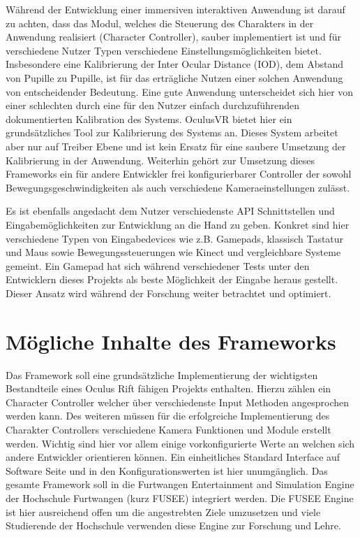 \documentclass[pagesize, paper=a4, fontsize=12pt,titlepage=true, headings=small, headnosepline, abstractoff, liststotoc, nochapterprefix, plainheadsepline]{scrreprt}
\begin{document}
Während der Entwicklung einer immersiven interaktiven Anwendung ist darauf zu achten, dass das Modul, welches die Steuerung des Charakters in der Anwendung realisiert (Character Controller), sauber implementiert ist und für verschiedene Nutzer Typen verschiedene Einstellungsmöglichkeiten bietet. Insbesondere eine Kalibrierung der Inter Ocular Distance (IOD), dem Abstand von Pupille zu Pupille, ist für das erträgliche Nutzen einer solchen Anwendung von entscheidender Bedeutung. Eine gute Anwendung unterscheidet sich hier von einer schlechten durch eine für den Nutzer einfach durchzuführenden dokumentierten Kalibration des Systems. OculusVR bietet hier ein grundsätzliches Tool zur Kalibrierung des Systems an. Dieses System arbeitet aber nur auf Treiber Ebene und ist kein Ersatz für eine saubere Umsetzung der Kalibrierung in der Anwendung.
Weiterhin gehört zur Umsetzung dieses Frameworks ein für andere Entwickler frei konfigurierbarer Controller der sowohl Bewegungsgeschwindigkeiten als auch verschiedene Kameraeinstellungen zulässt.

Es ist ebenfalls angedacht dem Nutzer verschiedenste API Schnittstellen und Eingabemöglichkeiten zur Entwicklung an die Hand zu geben. Konkret sind hier verschiedene Typen von Eingabedevices wie z.B. Gamepads, klassisch Tastatur und Maus sowie Bewegungssteuerungen wie Kinect und vergleichbare Systeme gemeint. Ein Gamepad hat sich während verschiedener Tests unter den Entwicklern dieses Projekts als beste Möglichkeit der Eingabe heraus gestellt. Dieser Ansatz wird während der Forschung weiter betrachtet und optimiert.


\section{Mögliche Inhalte des Frameworks}
Das Framework soll eine grundsätzliche Implementierung der wichtigsten Bestandteile eines Oculus Rift fähigen Projekts enthalten. Hierzu zählen ein Character Controller welcher über verschiedenste Input Methoden angesprochen werden kann. Des weiteren müssen für die erfolgreiche Implementierung des Charakter Controllers verschiedene Kamera Funktionen und Module erstellt werden. Wichtig sind hier vor allem einige vorkonfigurierte Werte an welchen sich andere Entwickler orientieren können. Ein einheitliches Standard Interface auf Software Seite und in den Konfigurationswerten ist hier unumgänglich. Das gesamte Framework soll in die Furtwangen Entertainment and Simulation Engine der Hochschule Furtwangen (kurz FUSEE) integriert werden. Die FUSEE Engine ist hier ausreichend offen um die angestrebten Ziele umzusetzen und viele Studierende der Hochschule verwenden diese Engine zur Forschung und Lehre.
\end{document}
